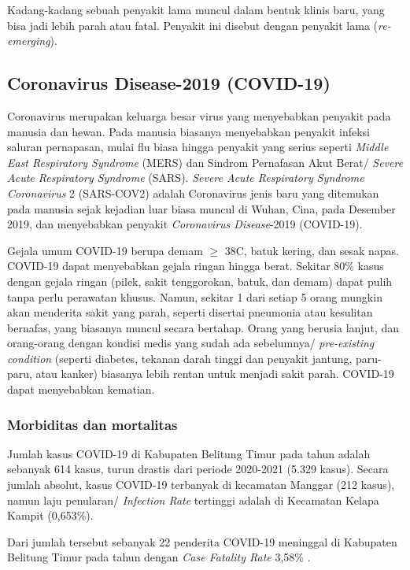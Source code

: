 Kadang-kadang sebuah penyakit lama muncul dalam bentuk klinis baru, yang bisa jadi lebih parah atau fatal.
Penyakit ini disebut dengan penyakit lama (\textit{re-emerging}).

\subsection{Coronavirus Disease-2019 (COVID-19)}
Coronavirus merupakan keluarga besar virus yang menyebabkan penyakit pada manusia dan hewan.
Pada manusia biasanya menyebabkan penyakit infeksi saluran pernapasan, mulai flu biasa hingga penyakit yang serius seperti \textit{Middle East Respiratory Syndrome} (MERS) dan Sindrom Pernafasan Akut Berat/ \textit{Severe Acute Respiratory Syndrome} (SARS).
\textit{Severe Acute Respiratory Syndrome Coronavirus} 2 (SARS-COV2) adalah Coronavirus jenis baru yang ditemukan pada manusia sejak kejadian luar biasa muncul di Wuhan, Cina, pada Desember 2019, dan menyebabkan penyakit \textit{Coronavirus Disease}-2019 (COVID-19).

Gejala umum COVID-19 berupa demam $\geq$ 38\textdegree C, batuk kering, dan sesak napas.
COVID-19 dapat menyebabkan gejala ringan hingga berat.
Sekitar 80\% kasus dengan gejala ringan (pilek, sakit tenggorokan, batuk, dan demam) dapat pulih tanpa perlu perawatan khusus.
Namun, sekitar 1 dari setiap 5 orang mungkin akan menderita sakit yang parah, seperti disertai pneumonia atau kesulitan bernafas, yang biasanya muncul secara bertahap.
Orang yang berusia lanjut, dan orang-orang dengan kondisi medis yang sudah ada sebelumnya/ \emph{pre-existing condition} (seperti diabetes, tekanan darah tinggi dan penyakit jantung, paru-paru, atau kanker) biasanya lebih rentan untuk menjadi sakit parah.
COVID-19 dapat menyebabkan kematian.

\subsubsection{Morbiditas dan mortalitas}
Jumlah kasus COVID-19 di Kabupaten Belitung Timur pada tahun \tP adalah sebanyak 614 kasus, turun drastis dari periode 2020-2021 (5.329 kasus). Secara jumlah absolut, kasus COVID-19 terbanyak di kecamatan Manggar (212 kasus), namun laju penularan/ \emph{Infection Rate} tertinggi adalah di Kecamatan Kelapa Kampit (0,653\%).

Dari jumlah tersebut sebanyak 22 penderita COVID-19 meninggal di Kabupaten Belitung Timur pada tahun \tP dengan \emph{Case Fatality Rate} 3,58\% .

